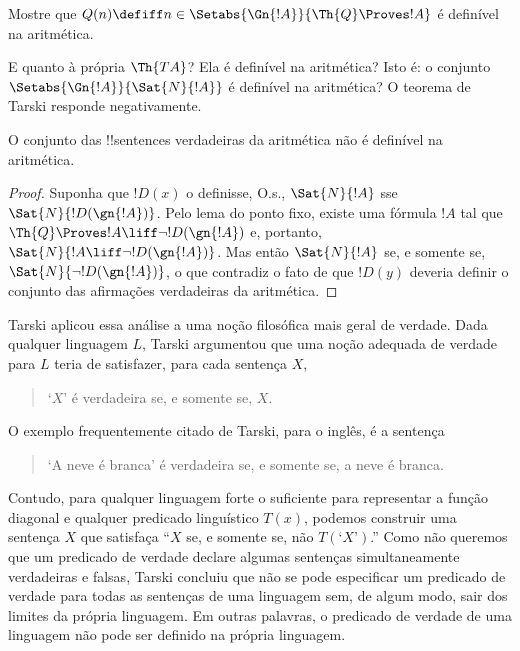 \documentclass[../../../include/open-logic-section]{subfiles}
\begin{document}
\begin{prob}
Mostre que $Q(n) \defiff n \in \Setabs{\Gn{!A}}{\Th{Q} \Proves !A}$ é
  definível na aritmética.
\end{prob}

E quanto à própria $\Th{TA}$? Ela é definível na aritmética? Isto é: o
conjunto $\Setabs{\Gn{!A}}{\Sat{N}{!A}}$ é definível na aritmética? O
teorema de Tarski responde negativamente.

\begin{thm}
O conjunto das !!{sentence}s verdadeiras da aritmética não é definível na
aritmética.
\end{thm}

\begin{proof} 
Suponha que $!D(x)$ o definisse, O.s.\@, $\Sat{N}{!A}$ sse
$\Sat{N}{!D(\gn{!A})}$. Pelo lema do ponto fixo, existe uma fórmula $!A$
tal que $\Th{Q} \Proves !A \liff \lnot !D(\gn{!A})$ e, portanto,
$\Sat{N}{!A \liff \lnot !D(\gn{!A})}$. Mas então $\Sat{N}{!A}$ se, e
somente se, $\Sat{N}{\lnot !D(\gn{!A})}$, o que contradiz o fato de que
$!D(y)$ deveria definir o conjunto das afirmações verdadeiras da aritmética.
\end{proof}

Tarski aplicou essa análise a uma noção filosófica mais geral de verdade.
Dada qualquer linguagem $L$, Tarski argumentou que uma noção adequada de
verdade para $L$ teria de satisfazer, para cada sentença $X$,
\begin{quote}
`$X$' é verdadeira se, e somente se, $X$.
\end{quote}
O exemplo frequentemente citado de Tarski, para o inglês, é a sentença
\begin{quote}
`A neve é branca' é verdadeira se, e somente se, a neve é branca.
\end{quote}
Contudo, para qualquer linguagem forte o suficiente para representar a
função diagonal e qualquer predicado linguístico $T(x)$, podemos construir
uma sentença $X$ que satisfaça ``$X$ se, e somente se, não
$T(\text{`$X$'})$.'' Como não queremos que um predicado de verdade declare
algumas sentenças simultaneamente verdadeiras e falsas, Tarski concluiu que
não se pode especificar um predicado de verdade para todas as sentenças de
uma linguagem sem, de algum modo, sair dos limites da própria linguagem. Em
outras palavras, o predicado de verdade de uma linguagem não pode ser
definido na própria linguagem.
\end{document}
